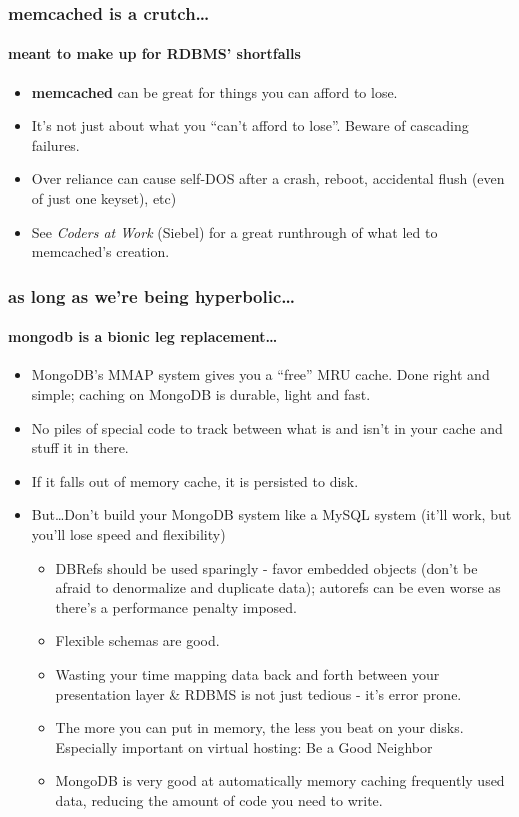 \documentclass{beamer}
\begin{document}
\begin{frame}
\frametitle{memcached is a crutch\dots}
\framesubtitle{meant to make up for RDBMS' shortfalls}
	\begin{itemize}
		\item {\bf memcached} can be great for things you can afford to lose.
		\item<2-> It's not just about what you ``can't afford to lose''. Beware of cascading failures. 
		\item<3-> Over reliance can cause self-DOS after a crash, reboot, accidental flush (even of just one keyset), etc)
		\item<4-> See {\em Coders at Work} (Siebel) for a great runthrough of what led to memcached's creation.
	\end{itemize}
\end{frame}
\begin{frame}
\frametitle{as long as we're being hyperbolic\dots}
\framesubtitle{mongodb is a bionic leg replacement\dots}
	\begin{itemize}
		\item MongoDB's MMAP system gives you a ``free'' MRU cache. Done right and simple; caching on MongoDB is durable, light and fast. 
		\item<2-> No piles of special code to track between what is and isn't in your cache and stuff it in there.
		\item<3-> If it falls out of memory cache, it is persisted to disk.  
		\item<4-> But\dots Don't build your MongoDB system like a MySQL system (it'll work, but you'll lose speed and flexibility)
			\begin{itemize}
				\item<5-> DBRefs should be used sparingly - favor embedded objects (don't be afraid to denormalize and duplicate data); autorefs can be even worse as there's a performance penalty imposed.
				\item<6-> Flexible schemas are good.
				\item<7-> Wasting your time mapping data back and forth between your presentation layer \& RDBMS is not just tedious - it's error prone.
				\item<8-> The more you can put in memory, the less you beat on your disks. Especially important on virtual hosting: Be a Good Neighbor
				\item<8-> MongoDB is very good at automatically memory caching frequently used data, reducing the amount of code you need to write.
			\end{itemize}
		\end{itemize}
\end{frame}
\end{document}
